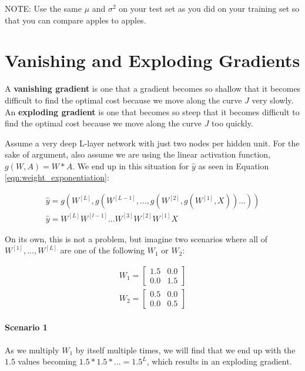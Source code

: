 \documentclass{article}
\begin{document}
NOTE: Use the same $\mu$ and $\sigma^2$ on your test set as you did on your training set so that you can compare apples to apples.

\section{Vanishing and Exploding Gradients}

A \textbf{vanishing gradient} is one that a gradient becomes so shallow that it becomes difficult to find the optimal cost because we move along the curve $J$ very slowly.  An \textbf{exploding gradient} is one that becomes so steep that it becomes difficult to find the optimal cost because we move along the curve $J$ too quickly.

Assume a very deep L-layer network with just two nodes per hidden unit.  For the sake of argument, also assume we are using the linear activation function, $g(W, A) = W * A$.  We end up in this situation for $\hat{y}$ as seen in Equation \ref{eqn:weight_exponentiation}:

\begin{gather}
\hat{y} = g(W^{[L]}, g(W^{[L-1]}, ..., g(W^{[2]}, g(W^{[1]}, X))...)) \\
\hat{y} = W^{[L]} W^{[l-1]} ... W^{[3]} W^{[2]} W^{[1]} X \label{eqn:weight_exponentiation}
\end{gather}

On its own, this is not a problem, but imagine two scenarios where all of $W^{[1]}, ..., W^{[L]}$ are one of the following $W_1$ or $W_2$:

\begin{gather}
W_1 = \begin{bmatrix}
1.5 & 0.0 \\
0.0 & 1.5
\end{bmatrix} \\
%
W_2 = \begin{bmatrix}
0.5 & 0.0 \\
0.0 & 0.5
\end{bmatrix}
\end{gather}

\paragraph{Scenario 1}

As we multiply $W_1$ by itself multiple times, we will find that we end up with the $1.5$ values becoming $1.5 * 1.5 * ... = 1.5^L$, which results in an exploding gradient.
\end{document}
